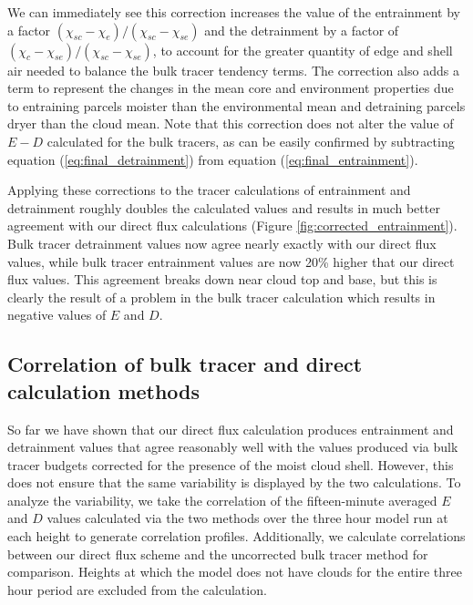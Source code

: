 \documentclass[12pt]{article}
\begin{document}
We can immediately see this correction increases the value of the entrainment 
by a factor $(\chi_{sc} - \chi_e)/(\chi_{sc} - \chi_{se})$ and the detrainment 
by a factor of $(\chi_c - \chi_{se})/(\chi_{sc} - \chi_{se})$, to account for 
the greater quantity of edge and shell air needed to balance the bulk tracer 
tendency terms.  The correction also adds a term to represent the changes in 
the mean core and environment properties due to entraining parcels moister than 
the environmental mean and detraining parcels dryer than the cloud mean.  Note 
that this correction does not alter the value of $E-D$ calculated for the bulk 
tracers, as can be easily confirmed by subtracting equation 
(\ref{eq:final_detrainment}) from equation (\ref{eq:final_entrainment}).

Applying these corrections to the tracer calculations of entrainment and 
detrainment roughly doubles the calculated values and results in much better 
agreement with our direct flux calculations (Figure 
\ref{fig:corrected_entrainment}).  Bulk tracer detrainment values now agree 
nearly exactly with our direct flux values, while bulk tracer entrainment 
values are now 20\% higher that our direct flux values.  This agreement breaks 
down near cloud top and base, but this is clearly the result of a problem in 
the bulk tracer calculation which results in negative values of $E$ and $D$.  


\subsection{Correlation of bulk tracer and direct calculation methods}

So far we have shown that our direct flux calculation produces entrainment and
detrainment values that agree reasonably well with the values produced via 
bulk tracer budgets corrected for the presence of the moist cloud shell.  
However, this does not ensure that the same variability is displayed by the two 
calculations.  To analyze the variability, we take the correlation of the 
fifteen-minute averaged $E$ and $D$ values calculated via the two methods over 
the three hour model run at each height to generate correlation profiles.  
Additionally, we calculate correlations between our direct flux scheme and 
the uncorrected bulk tracer method for comparison.  Heights at which the model 
does not have clouds for the entire three hour period are excluded from the 
calculation.  
\end{document}
